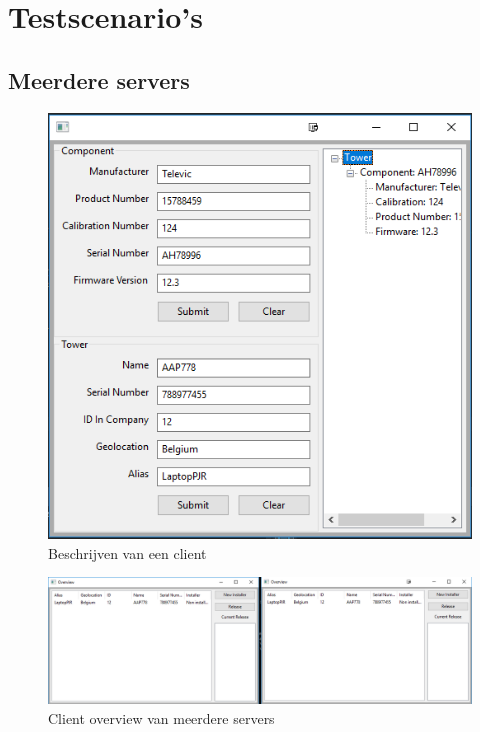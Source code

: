 \chapter{Testscenario's}\label{sec:testen}

\section{Meerdere servers}
\begin{figure}[!ht]
\centering
\includegraphics[scale=0.9]{afbeelding/testMultiServer/Setup.png}
\caption{Beschrijven van een client}
\label{fig:testServer:setup}
\end{figure}

\begin{figure}
\centering
\includegraphics[width=\textwidth,height=\textheight,keepaspectratio]{afbeelding/testMultiServer/twoserverview.png}
\caption{Client overview van meerdere servers}
\label{fig:testServer:overview}
\end{figure}

